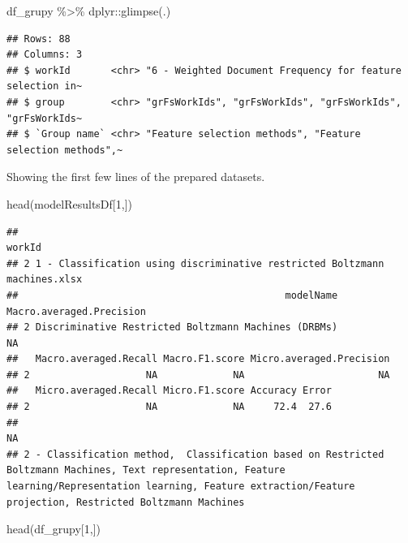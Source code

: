 \documentclass[
]{article}
\newenvironment{Shaded}{\begin{snugshade}}{\end{snugshade}}
\newcommand{\DecValTok}[1]{\textcolor[rgb]{0.00,0.00,0.81}{#1}}
\newcommand{\FunctionTok}[1]{\textcolor[rgb]{0.00,0.00,0.00}{#1}}
\newcommand{\NormalTok}[1]{#1}
\newcommand{\SpecialCharTok}[1]{\textcolor[rgb]{0.00,0.00,0.00}{#1}}
\begin{document}
\begin{Shaded}
\begin{Highlighting}[]
\NormalTok{df\_grupy }\SpecialCharTok{\%\textgreater{}\%}\NormalTok{ dplyr}\SpecialCharTok{::}\FunctionTok{glimpse}\NormalTok{(.)}
\end{Highlighting}
\end{Shaded}

\begin{verbatim}
## Rows: 88
## Columns: 3
## $ workId       <chr> "6 - Weighted Document Frequency for feature selection in~
## $ group        <chr> "grFsWorkIds", "grFsWorkIds", "grFsWorkIds", "grFsWorkIds~
## $ `Group name` <chr> "Feature selection methods", "Feature selection methods",~
\end{verbatim}

Showing the first few lines of the prepared datasets.

\begin{Shaded}
\begin{Highlighting}[]
\FunctionTok{head}\NormalTok{(modelResultsDf[}\DecValTok{1}\NormalTok{,])}
\end{Highlighting}
\end{Shaded}

\begin{verbatim}
##                                                                       workId
## 2 1 - Classification using discriminative restricted Boltzmann machines.xlsx
##                                              modelName Macro.averaged.Precision
## 2 Discriminative Restricted Boltzmann Machines (DRBMs)                       NA
##   Macro.averaged.Recall Macro.F1.score Micro.averaged.Precision
## 2                    NA             NA                       NA
##   Micro.averaged.Recall Micro.F1.score Accuracy Error
## 2                    NA             NA     72.4  27.6
##                                                                                                                                                                                                                     NA
## 2 - Classification method,  Classification based on Restricted Boltzmann Machines, Text representation, Feature learning/Representation learning, Feature extraction/Feature projection, Restricted Boltzmann Machines
\end{verbatim}

\begin{Shaded}
\begin{Highlighting}[]
\FunctionTok{head}\NormalTok{(df\_grupy[}\DecValTok{1}\NormalTok{,])}
\end{Highlighting}
\end{Shaded}
\end{document}
